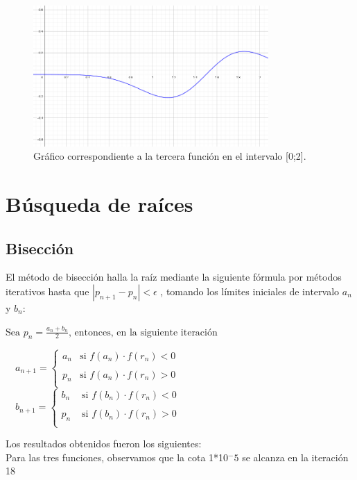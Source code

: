 \documentclass[titlepage,a4paper]{article}
\begin{document}
\begin{figure}[H]
\centering
\includegraphics[width=0.8\textwidth]{funcion3.png}
\caption{\label{fig:class01}Gráfico correspondiente a la tercera función en el intervalo [0;2].}
\end{figure}

\section{Búsqueda de raíces}\label{sec:busqueda_raices}

\subsection{Bisección}\label{sec:biseccion}
El método de bisección halla la raíz mediante la siguiente fórmula por métodos iterativos hasta que 
$ |p_{n+1} - p_{n}| < \mbox{$\epsilon$} $ , tomando los límites iniciales de intervalo ${a_n}$ y ${b_n}$:

\smallskip

$\mbox{Sea }p_n = \frac{a_n+b_n}{2}\mbox{, entonces, en la siguiente iteración}$
\begin{center}
    $
    \quad a_{n+1} =\left\{ \begin{array}{lcc}
                 a_n & \mbox{si } f(a_n)\cdot f(r_n) <0 \\
                 \\ p_n & \mbox{si } f(a_n)\cdot f(r_n) > 0 \\
                 \end{array}
       \right. 
    $
    $
    \quad b_{n+1} =\left\{ \begin{array}{lcc}
                 b_n & \mbox{ si } f(b_n)\cdot f(r_n) < 0 \\
                 \\p_n & \mbox{ si } f(b_n)\cdot f(r_n) > 0 \\
                 \end{array}
       \right.
    $
\end{center}
\smallskip
Los resultados obtenidos fueron los siguientes:
\\Para las tres funciones, observamos que la cota 1*10$^-5$ se alcanza en la iteración 18
\end{document}
